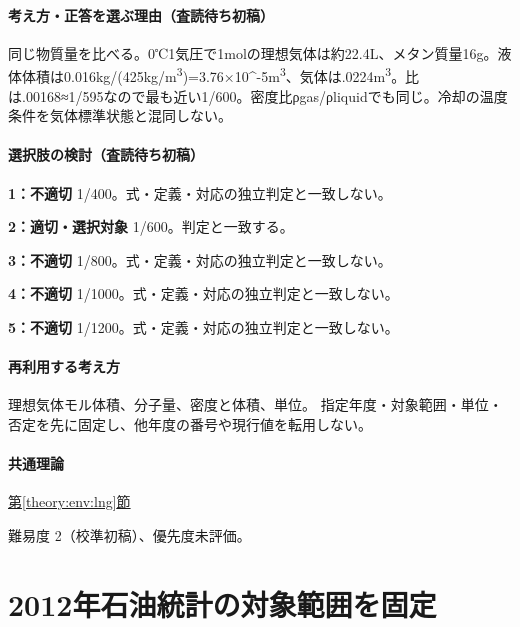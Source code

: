 \paragraph{考え方・正答を選ぶ理由（査読待ち初稿）} 同じ物質量を比べる。0℃1気圧で1molの理想気体は約22.4L、メタン質量16g。液体体積は0.016kg/(425kg/m\textsuperscript{3})=\allowbreak{}3.76×10\textasciicircum{}-5m\textsuperscript{3}、気体は.0224m\textsuperscript{3}。比は.00168≈1/595なので最も近い1/600。密度比ρgas/ρliquidでも同じ。冷却の温度条件を気体標準状態と混同しない。

\paragraph{選択肢の検討（査読待ち初稿）}\mbox{}\par

\noindent\textbf{1：不適切} 1/400。式・定義・対応の独立判定と一致しない。\par

\noindent\textbf{2：適切・選択対象} 1/600。判定と一致する。\par

\noindent\textbf{3：不適切} 1/800。式・定義・対応の独立判定と一致しない。\par

\noindent\textbf{4：不適切} 1/1000。式・定義・対応の独立判定と一致しない。\par

\noindent\textbf{5：不適切} 1/1200。式・定義・対応の独立判定と一致しない。\par

\paragraph{再利用する考え方} 理想気体モル体積、分子量、密度と体積、単位。 指定年度・対象範囲・単位・否定を先に固定し、他年度の番号や現行値を転用しない。

\paragraph{共通理論} \hyperref[theory:env:lng]{第\ref*{theory:env:lng}節}

\par 難易度 2（校準初稿）、優先度未評価。

\section{2012年石油統計の対象範囲を固定}


